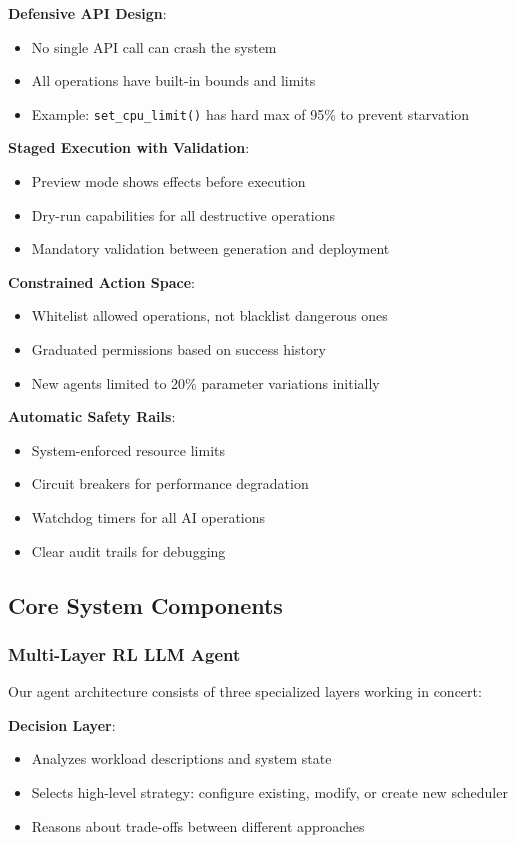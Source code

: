 \textbf{Defensive API Design}:
\begin{itemize}
\item No single API call can crash the system
\item All operations have built-in bounds and limits
\item Example: \texttt{set\_cpu\_limit()} has hard max of 95\% to prevent starvation
\end{itemize}

\textbf{Staged Execution with Validation}:
\begin{itemize}
\item Preview mode shows effects before execution
\item Dry-run capabilities for all destructive operations
\item Mandatory validation between generation and deployment
\end{itemize}

\textbf{Constrained Action Space}:
\begin{itemize}
\item Whitelist allowed operations, not blacklist dangerous ones
\item Graduated permissions based on success history
\item New agents limited to 20\% parameter variations initially
\end{itemize}

\textbf{Automatic Safety Rails}:
\begin{itemize}
\item System-enforced resource limits
\item Circuit breakers for performance degradation
\item Watchdog timers for all AI operations
\item Clear audit trails for debugging
\end{itemize}

\subsection{Core System Components}

\subsubsection{Multi-Layer RL LLM Agent}
Our agent architecture consists of three specialized layers working in concert:

\textbf{Decision Layer}:
\begin{itemize}
\item Analyzes workload descriptions and system state
\item Selects high-level strategy: configure existing, modify, or create new scheduler
\item Reasons about trade-offs between different approaches
\end{itemize}

